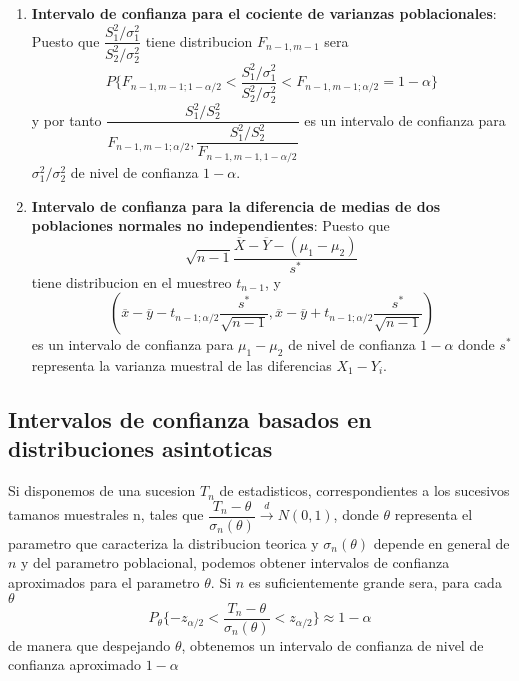 \documentclass[10pt]{extarticle}
\newcommand{\<}{\langle}
\renewcommand{\>}{\rangle}
\theoremstyle{definition}
\begin{document}
\begin{enumerate}
  \item \textbf{Intervalo de confianza para el cociente de varianzas poblacionales}: Puesto que $\dfrac{S_1^2/\sigma_1^2}{S_2^2/\sigma_2^2}$ tiene distribucion $F_{n-1, m-1}$ sera
        \begin{equation*}
          P \{ F_{n-1,m-1;1-\alpha/2} < \dfrac{S_1^2/\sigma_1^2}{S_2^2/\sigma_2^2} < F_{n-1,m-1;\alpha/2} = 1- \alpha \}
        \end{equation*}
        y por tanto $\dfrac{S_1^2/S_2^2}{F_{n-1,m-1;\alpha/2}, \dfrac{S_1^2/S_2^2}{F_{n-1,m-1, 1-\alpha/2}}}$ es un intervalo de confianza para $\sigma_1^2/\sigma_2^2$ de nivel de confianza $1-\alpha$.

  \item \textbf{Intervalo de confianza para la diferencia de medias de dos poblaciones normales no independientes}: Puesto que
        \begin{equation*}
          \sqrt{n-1}\dfrac{\overline{X}-\overline{Y} - (\mu_1-\mu_2)}{s^*}
        \end{equation*}
        tiene distribucion en el muestreo $t_{n-1}$, y
        \begin{equation*}
          (\overline{x}-\overline{y}-t_{n-1;\alpha/2} \dfrac{s^*}{\sqrt{n-1}}, \overline{x}-\overline{y}+t_{n-1;\alpha/2} \dfrac{s^*}{\sqrt{n-1}})
        \end{equation*}
        es un intervalo de confianza para $\mu_1-\mu_2$ de nivel de confianza $1-\alpha$ donde $s^*$ representa la varianza muestral de las diferencias $X_1-Y_i$.
\end{enumerate}

\subsection*{Intervalos de confianza basados en distribuciones asintoticas}

Si disponemos de una sucesion $T_n$ de estadisticos, correspondientes a los sucesivos tamanos muestrales n, tales que $\dfrac{T_n-\theta}{\sigma_n(\theta)} \xrightarrow{d} N(0,1)$, donde $\theta$ representa el parametro que caracteriza la distribucion teorica y $\sigma_n(\theta)$ depende en general de $n$ y del parametro poblacional, podemos obtener intervalos de confianza aproximados para el parametro $\theta$. Si $n$ es suficientemente grande sera, para cada $\theta$
\begin{equation*}
  P_\theta \{ -z_{\alpha/2} < \dfrac{T_n-\theta}{\sigma_n(\theta)}<z_{\alpha/2} \} \approx 1-\alpha
\end{equation*}
de manera que despejando $\theta$, obtenemos un intervalo de confianza de nivel de confianza aproximado $1-\alpha$
\end{document}
